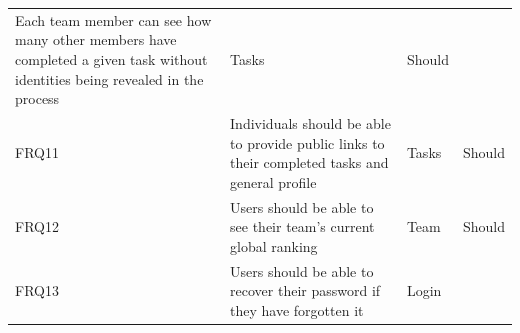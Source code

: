\begin{longtable}[]{@{}llll@{}}
\begin{minipage}[t]{0.64\columnwidth}
Each team member can see how many other members have completed a given
task without identities being revealed in the process\strut
\end{minipage} & \begin{minipage}[t]{0.12\columnwidth}\raggedright\strut
Tasks\strut
\end{minipage} & \begin{minipage}[t]{0.09\columnwidth}\raggedright\strut
Should\strut
\end{minipage}\tabularnewline
\begin{minipage}[t]{0.04\columnwidth}\raggedright\strut
FRQ11\strut
\end{minipage} & \begin{minipage}[t]{0.64\columnwidth}\raggedright\strut
Individuals should be able to provide public links to their completed
tasks and general profile\strut
\end{minipage} & \begin{minipage}[t]{0.12\columnwidth}\raggedright\strut
Tasks\strut
\end{minipage} & \begin{minipage}[t]{0.09\columnwidth}\raggedright\strut
Should\strut
\end{minipage}\tabularnewline
\begin{minipage}[t]{0.04\columnwidth}\raggedright\strut
FRQ12\strut
\end{minipage} & \begin{minipage}[t]{0.64\columnwidth}\raggedright\strut
Users should be able to see their team's current global ranking\strut
\end{minipage} & \begin{minipage}[t]{0.12\columnwidth}\raggedright\strut
Team\strut
\end{minipage} & \begin{minipage}[t]{0.09\columnwidth}\raggedright\strut
Should\strut
\end{minipage}\tabularnewline
\begin{minipage}[t]{0.04\columnwidth}\raggedright\strut
FRQ13\strut
\end{minipage} & \begin{minipage}[t]{0.64\columnwidth}\raggedright\strut
Users should be able to recover their password if they have forgotten
it\strut
\end{minipage} & \begin{minipage}[t]{0.12\columnwidth}\raggedright\strut
Login\strut
\end{minipage} & \begin{minipage}[t]{0.09\columnwidth}\raggedright\strut

\end{minipage}
\end{longtable}
